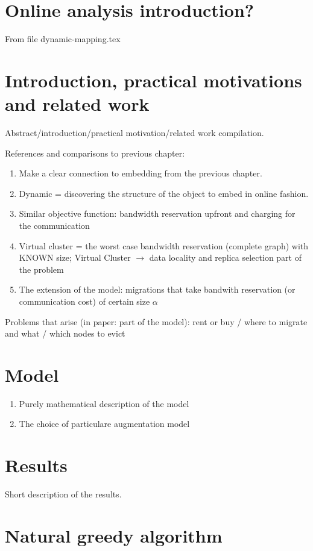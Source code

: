 \section{Online analysis introduction?}

From file dynamic-mapping.tex

\section{Introduction, practical motivations and related work}

Abstract/introduction/practical motivation/related work compilation.

References and comparisons to previous chapter:
\begin{enumerate}
  \item Make a clear connection to embedding from the previous chapter.
  \item Dynamic = discovering the structure of the object to embed in online fashion.
  \item Similar objective function: bandwidth reservation upfront and charging for the communication
  \item Virtual cluster = the worst case bandwidth reservation (complete graph) with KNOWN size; Virtual Cluster $\rightarrow$ data locality and replica selection part of the problem
  \item The extension of the model: migrations that take bandwith reservation (or communication cost) of certain size $\alpha$
\end{enumerate}

Problems that arise (in paper: part of the model): rent or buy / where to migrate and what / which nodes to evict

\section{Model}
\begin{enumerate}
  \item Purely mathematical description of the model
  \item The choice of particulare augmentation model
\end{enumerate}
\section{Results}
Short description of the results.
\section{Natural greedy algorithm}

